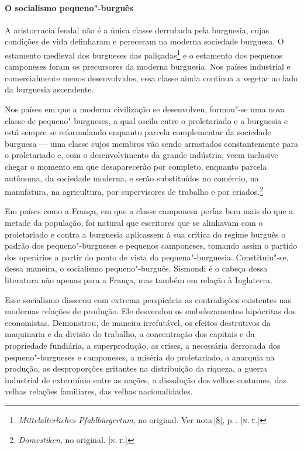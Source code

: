 \paragraph{O socialismo pequeno"-burguês}

A aristocracia feudal não é a única classe derrubada pela
burguesia, cujas condições de vida definharam e pereceram na moderna
sociedade burguesa. O estamento medieval dos burgueses das
paliçadas\footnote{\textit{Mittelalterliches Pfahlbürgertum},
no original. Ver nota\,\ref{8}, p.\,\pageref{8}. [\textsc{n.\,t.}]} e o estamento dos pequenos camponeses
foram os precursores da moderna burguesia. Nos países industrial e
comercialmente menos desenvolvidos, essa classe ainda continua a
vegetar ao lado da burguesia ascendente.

Nos países em que a moderna civilização se desenvolveu,
formou"-se uma nova classe de pequeno"-burgueses, a qual oscila entre
o proletariado e a burguesia e está sempre se reformulando enquanto
parcela complementar da sociedade burguesa  ---  uma classe cujos membros
vão sendo arrastados constantemente para o proletariado e, com o
desenvolvimento da grande indústria, veem inclusive chegar o momento em
que desaparecerão por completo, enquanto parcela autônoma, da sociedade
moderna, e serão substituídos no comércio, na manufatura, na
agricultura, por supervisores de trabalho e por
criados.\footnote{\textit{Domestiken}, no original. [\textsc{n.\,t.}]}

Em países como a França, em que a classe camponesa perfaz bem mais do
que a metade da população, foi natural que escritores que se alinhavam
com o proletariado e contra a burguesia aplicassem à sua crítica do
regime burguês o padrão dos pequeno"-burgueses e pequenos camponeses,
tomando assim o partido dos operários a partir do ponto de vista da
pequena"-burguesia. Constituiu"-se, dessa maneira, o socialismo
pequeno"-burguês. Sismondi é o cabeça dessa literatura não apenas para
a França, mas também em relação à Inglaterra.

Esse socialismo dissecou com extrema perspicácia as contradições
existentes nas modernas relações de produção. Ele desvendou os
embelezamentos hipócritas dos economistas. Demonstrou, de maneira
irrefutável, os efeitos destrutivos da maquinaria e da divisão do
trabalho, a concentração dos capitais e da propriedade fundiária, a
superprodução, as crises, a necessária derrocada dos pequeno"-burgueses
e camponeses, a miséria do proletariado, a anarquia na produção, as
desproporções gritantes na distribuição da riqueza, a guerra industrial
de extermínio entre as nações, a dissolução dos velhos costumes, das
velhas relações familiares, das velhas nacionalidades.

